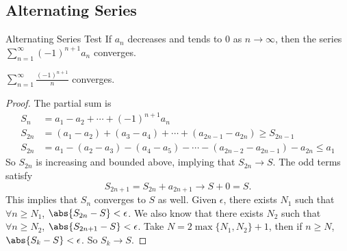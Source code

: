 \subsection{Alternating Series}
\leavevmode
\begin{theorem}{Alternating Series Test}{}
    If \(a_n\) decreases and tends to 0 as \(n \to \infty\), then the series \(\sum\limits_{n=1}^{\infty} (-1)^{n+1}a_n\) converges.
\end{theorem}
\begin{example}
    \(\sum\limits_{n=1}^{\infty} \frac{(-1)^{n+1}}{n}\) converges.
\end{example}
\begin{proof}
    The partial sum is
    \begin{align*}
        S_n &= a_1 - a_2 + \cdots + (-1)^{n+1}a_n\\
        S_{2n} &= (a_1 - a_2) + (a_3 - a_4) + \cdots + (a_{2n - 1} - a_{2n}) \geq S_{2n - 1}\\
        S_{2n} &= a_1 - (a_2 - a_3) - (a_4 - a_5) - \cdots - (a_{2n - 2} - a_{2n-1}) - a_{2n} \leq a_1
    \end{align*}
    So \(S_{2n}\) is increasing and bounded above, implying that \(S_{2n}\to S\). The odd terms satisfy
    \[
        S_{2n + 1} = S_{2n} + a_{2n + 1} \to S + 0 = S.
    \]
    This implies that \(S_n\) converges to \(S\) as well. Given \(\epsilon\), there exists \(N_1\) such that \(\forall n \geq N_1\), \(\abs{S_{2n}-S} < \epsilon\). We also know that there exists \(N_2\) such that \(\forall n \geq N_2\), \(\abs{S_{2n + 1} - S} <\epsilon\). Take \(N = 2 \mathop{\max} \{N_1, N_2\} + 1\), then if \(n \geq N\), \(\abs{S_k - S} < \epsilon\). So \(S_k \to S\).
\end{proof}